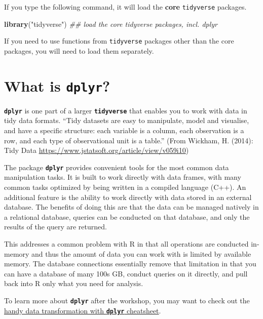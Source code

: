 \documentclass[]{book}
\newenvironment{Shaded}{\begin{snugshade}}{\end{snugshade}}
\newcommand{\CommentTok}[1]{\textcolor[rgb]{0.56,0.35,0.01}{\textit{#1}}}
\newcommand{\KeywordTok}[1]{\textcolor[rgb]{0.13,0.29,0.53}{\textbf{#1}}}
\newcommand{\NormalTok}[1]{#1}
\newcommand{\StringTok}[1]{\textcolor[rgb]{0.31,0.60,0.02}{#1}}
\begin{document}
If you type the following command, it will load the \textbf{core} \texttt{tidyverse} packages.

\begin{Shaded}
\begin{Highlighting}[]
\KeywordTok{library}\NormalTok{(}\StringTok{"tidyverse"}\NormalTok{)    }\CommentTok{## load the core tidyverse packages, incl. dplyr}
\end{Highlighting}
\end{Shaded}

If you need to use functions from \texttt{tidyverse} packages other than the core packages, you will need to load them separately.

\hypertarget{what-is-dplyr}{%
\section{\texorpdfstring{What is \textbf{\texttt{dplyr}}?}{What is dplyr?}}\label{what-is-dplyr}}

\textbf{\texttt{dplyr}} is one part of a larger \textbf{\texttt{tidyverse}} that enables you to work
with data in tidy data formats. ``Tidy datasets are easy to manipulate, model and visualise, and have a specific structure: each variable is a column, each observation is a row, and each type of observational unit is a table.'' (From Wickham, H. (2014): Tidy Data \url{https://www.jstatsoft.org/article/view/v059i10})

The package \textbf{\texttt{dplyr}} provides convenient tools for the most common data manipulation
tasks. It is built to work directly with data frames, with many common tasks
optimized by being written in a compiled language (C++). An additional feature is the
ability to work directly with data stored in an external database. The benefits of
doing this are that the data can be managed natively in a relational database,
queries can be conducted on that database, and only the results of the query are
returned.

This addresses a common problem with R in that all operations are conducted
in-memory and thus the amount of data you can work with is limited by available
memory. The database connections essentially remove that limitation in that you
can have a database of many 100s GB, conduct queries on it directly, and pull
back into R only what you need for analysis.

To learn more about \textbf{\texttt{dplyr}} after the workshop, you may want to check out the \href{https://github.com/rstudio/cheatsheets/raw/master/data-transformation.pdf}{handy data transformation with \textbf{\texttt{dplyr}} cheatsheet}.
\end{document}
